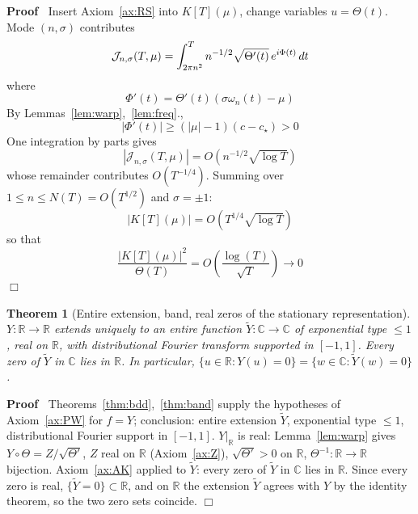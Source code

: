 \documentclass{article}
\newenvironment{proof}{\noindent\textbf{Proof\ }}{\hspace*{\fill}$\Box$\medskip}
\newtheorem{theorem}{Theorem}
\newcommand{\R}{\mathbb{R}}
\newcommand{\C}{\mathbb{C}}
\begin{document}
\begin{proof}
  Insert Axiom~\ref{ax:RS} into $K [T] (\mu)$, change variables $u = \Theta
  (t)$. Mode $(n, \sigma)$ contributes
  \begin{equation}
    \mathcal{J}_{n, \sigma} (T, \mu) = \int_{2 \pi n^2}^T n^{- 1 / 2} 
    \sqrt{\Theta' (t)}  \hspace{0.17em} e^{i \Phi (t)}  \hspace{0.17em} dt
  \end{equation}
  where
  \begin{equation}
    \Phi' (t) = \Theta' (t)  (\sigma \omega_n (t) - \mu)
  \end{equation}
  By Lemmas~\ref{lem:warp},~\ref{lem:freq}.,
  \begin{equation}
    | \Phi' (t) | \ge (| \mu | - 1)  (c - c_{\star}) > 0
  \end{equation}
  One integration by parts gives
  \begin{equation}
    |\mathcal{J}_{n, \sigma} (T, \mu) | = O (n^{- 1 / 2}  \sqrt{\log T})
  \end{equation}
  whose remainder contributes $O (T^{- 1 / 4})$. Summing over $1 \le n \le N
  (T) = O (T^{1 / 2})$ and $\sigma = \pm 1$:
  \[ |K [T] (\mu) | = O (T^{1 / 4}  \sqrt{\log T}) \]
  so that
  \begin{equation}
    \frac{|K [T] (\mu) |^2}{\Theta (T)} = O \left( \frac{\log (T)}{\sqrt{T}}
    \right) \to 0
  \end{equation}
\end{proof}

\begin{theorem}
  [Entire extension, band, real zeros of the stationary
  representation]\label{thm:ent} $Y : \R \to \R$ extends uniquely to an entire
  function $\tilde{Y} : \C \to \C$ of exponential type $\le 1$, real on $\R$,
  with distributional Fourier transform supported in $[- 1, 1]$. Every zero of
  $\tilde{Y}$ in $\C$ lies in $\R$. In particular, $\{u \in \R : Y (u) = 0\} =
  \{w \in \C : \tilde{Y} (w) = 0\}$.
\end{theorem}

\begin{proof}
  Theorems~\ref{thm:bdd},~\ref{thm:band} supply the hypotheses of
  Axiom~\ref{ax:PW} for $f = Y$; conclusion: entire extension $\tilde{Y}$,
  exponential type $\le 1$, distributional Fourier support in $[- 1, 1]$.
  $Y|_{\R}$ is real: Lemma~\ref{lem:warp} gives $Y \circ \Theta = Z /
  \sqrt{\Theta'}$, $Z$ real on $\R$ (Axiom~\ref{ax:Z}), $\sqrt{\Theta'} > 0$
  on $\R$, $\Theta^{- 1} : \R \to \R$ bijection. Axiom~\ref{ax:AK} applied to
  $\tilde{Y}$: every zero of $\tilde{Y}$ in $\C$ lies in $\R$. Since every
  zero is real, $\{ \tilde{Y} = 0\} \subset \R$, and on $\R$ the extension
  $\tilde{Y}$ agrees with $Y$ by the identity theorem, so the two zero sets
  coincide.
\end{proof}
\end{document}
